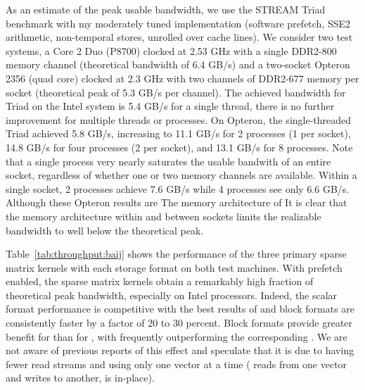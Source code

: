 As an estimate of the peak usable bandwidth, we use the STREAM Triad benchmark with my moderately tuned implementation (software prefetch, SSE2 arithmetic, non-temporal stores, unrolled over cache lines).
We consider two test systems, a Core 2 Duo (P8700) clocked at 2.53 GHz with a single DDR2-800 memory channel (theoretical bandwidth of 6.4 GB/s) and a two-socket Opteron 2356 (quad core) clocked at 2.3 GHz with two channels of DDR2-677 memory per socket (theoretical peak of 5.3 GB/s per channel).
The achieved bandwidth for Triad on the Intel system is 5.4 GB/s for a single thread, there is no further improvement for multiple threads or processes.
On Opteron, the single-threaded Triad achieved 5.8 GB/s, increasing to 11.1 GB/s for 2 processes (1 per socket), 14.8 GB/s for four processes (2 per socket), and 13.1 GB/s for 8 processes.
Note that a single process very nearly saturates the usable bandwith of an entire socket, regardless of whether one or two memory channels are available.
Within a single socket, 2 processes achieve 7.6 GB/s while 4 processes see only 6.6 GB/s.
Although these Opteron results are 
The memory architecture of 
It is clear that the memory architecture within and between sockets limits the realizable bandwidth to well below the theoretical peak.

Table~\ref{tab:throughput:baij} shows the performance of the three primary sparse matrix kernels with each storage format on both test machines.
With prefetch enabled, the sparse matrix kernels obtain a remarkably high fraction of theoretical peak bandwidth, especially on Intel processors.
Indeed, the scalar format performance is competitive with the best {\MatMult} results of \citet{williams2007osm} and block formats are consistently faster by a factor of 20 to 30 percent.
Block formats provide greater benefit for {\MatSolve} than for {\MatMult}, with {\BAIJ} {\MatSolve} frequently outperforming the corresponding {\MatMult}.
We are not aware of previous reports of this effect and speculate that it is due to {\MatSolve} having fewer read streams and using only one vector at a time ({\MatMult} reads from one vector and writes to another, {\MatSolve} is in-place).

